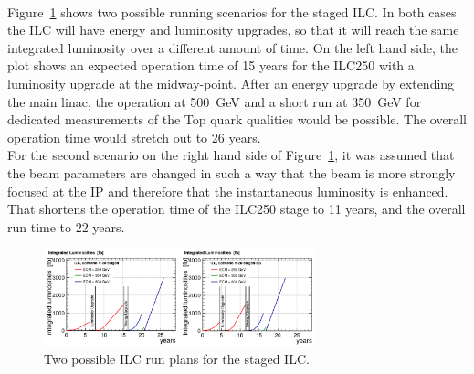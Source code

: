 \\Figure~\ref{fig:ILC_runningtime} shows two possible running scenarios for the staged ILC.
In both cases the ILC will have energy and luminosity upgrades, so that it will reach the same integrated luminosity over a different amount of time.
On the left hand side, the plot shows an expected operation time of 15 years for the ILC250 with a luminosity upgrade at the midway-point.
After an energy upgrade by extending the main linac, the operation at \SI{500}{\GeV} and a short run at \SI{350}{\GeV} for dedicated measurements of the Top quark qualities would be possible.
The overall operation time would stretch out to 26 years.\\
For the second scenario on the right hand side of Figure~\ref{fig:ILC_runningtime}, it was assumed that the beam parameters are changed in such a way that the beam is more strongly focused at the IP and therefore that the instantaneous luminosity is enhanced.
That shortens the operation time of the ILC250 stage to 11 years, and the overall run time to 22 years.~\cite[p. 7]{PhysicsCase}
\begin{figure}[h]
\centering
\includegraphics[width=0.7\textwidth]{Figures/ILC_runningtime.png}
\caption[ILC run plan]{Two possible ILC run plans for the staged ILC.~\cite[p. 8]{PhysicsCase}}
\label{fig:ILC_runningtime}
\end{figure}

